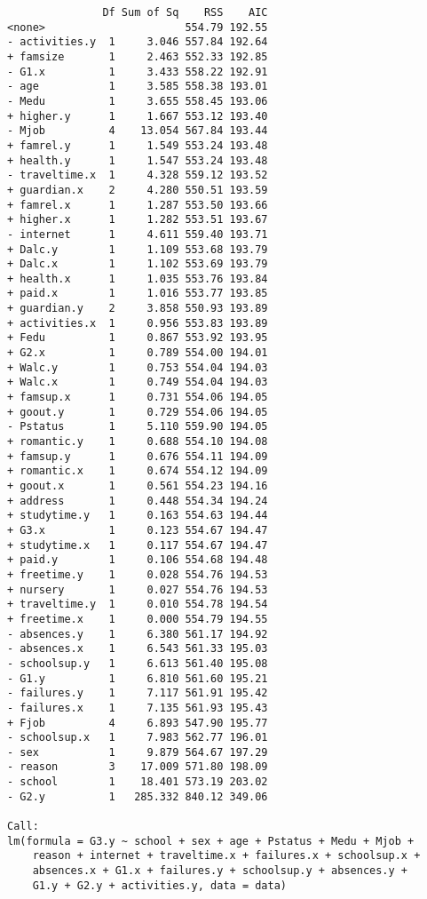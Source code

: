 \documentclass[11pt]{article}
\begin{document}
\begin{enumerate}
\begin{verbatim}
               Df Sum of Sq    RSS    AIC
<none>                      554.79 192.55
- activities.y  1     3.046 557.84 192.64
+ famsize       1     2.463 552.33 192.85
- G1.x          1     3.433 558.22 192.91
- age           1     3.585 558.38 193.01
- Medu          1     3.655 558.45 193.06
+ higher.y      1     1.667 553.12 193.40
- Mjob          4    13.054 567.84 193.44
+ famrel.y      1     1.549 553.24 193.48
+ health.y      1     1.547 553.24 193.48
- traveltime.x  1     4.328 559.12 193.52
+ guardian.x    2     4.280 550.51 193.59
+ famrel.x      1     1.287 553.50 193.66
+ higher.x      1     1.282 553.51 193.67
- internet      1     4.611 559.40 193.71
+ Dalc.y        1     1.109 553.68 193.79
+ Dalc.x        1     1.102 553.69 193.79
+ health.x      1     1.035 553.76 193.84
+ paid.x        1     1.016 553.77 193.85
+ guardian.y    2     3.858 550.93 193.89
+ activities.x  1     0.956 553.83 193.89
+ Fedu          1     0.867 553.92 193.95
+ G2.x          1     0.789 554.00 194.01
+ Walc.y        1     0.753 554.04 194.03
+ Walc.x        1     0.749 554.04 194.03
+ famsup.x      1     0.731 554.06 194.05
+ goout.y       1     0.729 554.06 194.05
- Pstatus       1     5.110 559.90 194.05
+ romantic.y    1     0.688 554.10 194.08
+ famsup.y      1     0.676 554.11 194.09
+ romantic.x    1     0.674 554.12 194.09
+ goout.x       1     0.561 554.23 194.16
+ address       1     0.448 554.34 194.24
+ studytime.y   1     0.163 554.63 194.44
+ G3.x          1     0.123 554.67 194.47
+ studytime.x   1     0.117 554.67 194.47
+ paid.y        1     0.106 554.68 194.48
+ freetime.y    1     0.028 554.76 194.53
+ nursery       1     0.027 554.76 194.53
+ traveltime.y  1     0.010 554.78 194.54
+ freetime.x    1     0.000 554.79 194.55
- absences.y    1     6.380 561.17 194.92
- absences.x    1     6.543 561.33 195.03
- schoolsup.y   1     6.613 561.40 195.08
- G1.y          1     6.810 561.60 195.21
- failures.y    1     7.117 561.91 195.42
- failures.x    1     7.135 561.93 195.43
+ Fjob          4     6.893 547.90 195.77
- schoolsup.x   1     7.983 562.77 196.01
- sex           1     9.879 564.67 197.29
- reason        3    17.009 571.80 198.09
- school        1    18.401 573.19 203.02
- G2.y          1   285.332 840.12 349.06

Call:
lm(formula = G3.y ~ school + sex + age + Pstatus + Medu + Mjob + 
    reason + internet + traveltime.x + failures.x + schoolsup.x + 
    absences.x + G1.x + failures.y + schoolsup.y + absences.y + 
    G1.y + G2.y + activities.y, data = data)


\end{verbatim}
\end{enumerate}
\end{document}
